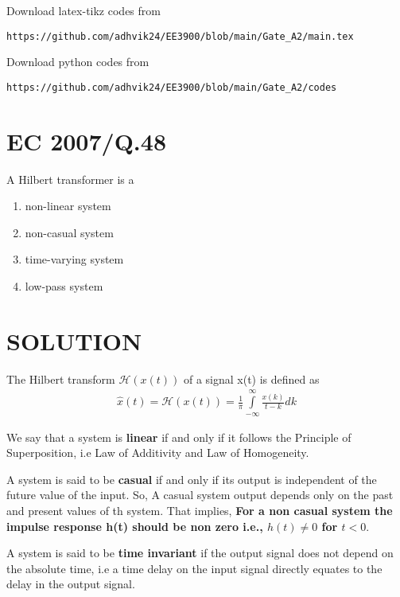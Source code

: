 \documentclass[journal,12pt,twocolumn]{IEEEtran}
\begin{document}
Download latex-tikz codes from 
%
\begin{lstlisting}
https://github.com/adhvik24/EE3900/blob/main/Gate_A2/main.tex
\end{lstlisting}
%
Download python codes from 
%
\begin{lstlisting}
https://github.com/adhvik24/EE3900/blob/main/Gate_A2/codes
\end{lstlisting}
\section{EC 2007/Q.48}
A Hilbert transformer is a
\begin{enumerate}
    \item non-linear system
    \item non-casual system
    \item time-varying system
    \item low-pass system
\end{enumerate}
\section{SOLUTION}
\begin{definition}
The Hilbert transform $\mathcal{H}(x(t))$ of a signal x(t) is defined as
\begin{align}
    \hat{x}(t)=\mathcal{H}(x(t))= \frac{1}{\pi}\int\limits_{-\infty}^{\infty}\frac{x(k)}{t-k} dk
\end{align}
\end{definition}
\begin{definition}
We say that a system is\textbf{ linear} if and only if it follows the Principle of Superposition, i.e Law of Additivity and Law of Homogeneity.
\label{L}
\end{definition}

\begin{definition}
A system is said to be \textbf{casual} if and only if its output is independent of the future value of the input. So, A casual system output depends only on the past and present values of th system.
That implies, \textbf{For a non casual system the impulse response h(t) should be non zero i.e., $h(t)\ne0$ for $t<0$}. \label{def}
\end{definition}

\begin{definition}
A system is said to be \textbf{time invariant} if the output signal does not depend on the absolute time, i.e a time delay on the input signal directly equates to the delay in the output signal.
\label{T}
\end{definition}
\end{document}
